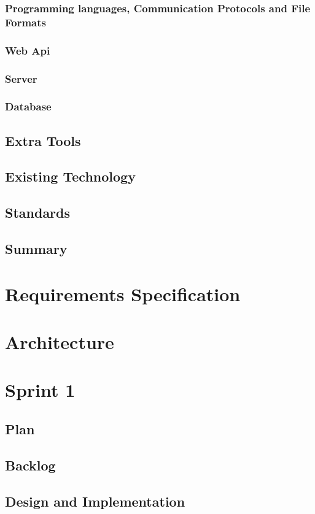 \documentclass[12pt, a4paper]{article}
\begin{document}
\subsubsection{Programming languages, Communication Protocols and File Formats}
\subsubsection{Web Api}
\subsubsection{Server}
\subsubsection{Database}
\subsection{Extra Tools}
\subsection{Existing Technology}
\subsection{Standards}
\subsection{Summary}

\section{Requirements Specification}

\section{Architecture}

\section{Sprint 1}
\subsection{Plan}
\subsection{Backlog}
\subsection{Design and Implementation}
\end{document}
